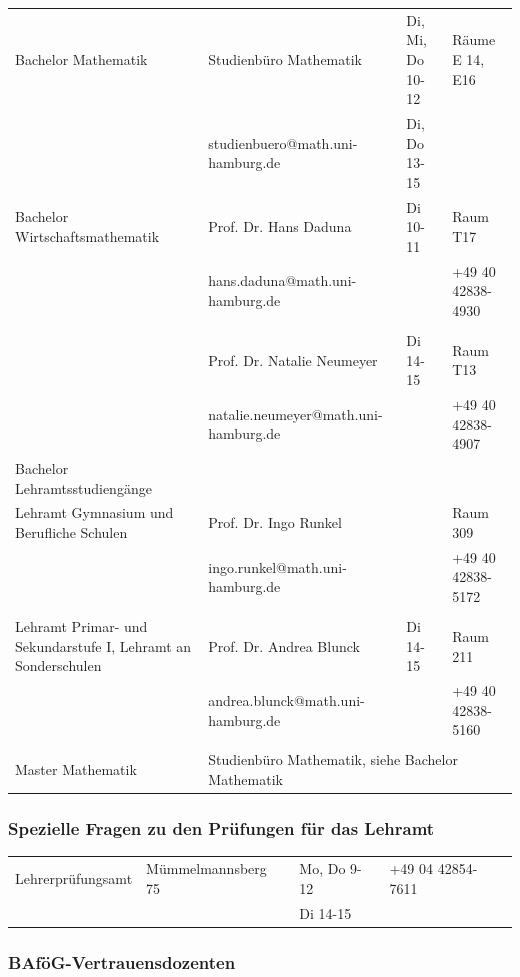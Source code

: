 
\begin{tabularx}{\textwidth}{|X|X|X|X|}
\hline Bachelor Mathematik&Studienbüro Mathematik&Di, Mi, Do \hfill 10-12
    &Räume E 14, E16\\
    &studienbuero@math.uni-hamburg.de&Di, Do \hfill13-15&\\
\hline Bachelor Wirtschaftsmathematik&Prof. Dr. Hans Daduna&Di \hfill 10-11
    &Raum T17 \\
&hans.daduna@math.uni-hamburg.de&&+49 40 42838-4930\\
&&&\\
&Prof. Dr. Natalie Neumeyer&Di \hfill 14-15&Raum T13\\
&natalie.neumeyer@math.uni-hamburg.de&&+49 40 42838-4907\\
\hline Bachelor Lehramtsstudiengänge&&&\\
Lehramt Gymnasium und Berufliche Schulen&Prof. Dr. Ingo Runkel&&Raum 309\\
    &ingo.runkel@math.uni-hamburg.de&&+49 40 42838-5172\\
&&&\\
Lehramt Primar- und Sekundarstufe I, Lehramt an Sonderschulen
    &Prof. Dr. Andrea Blunck&Di \hfill 14-15&Raum 211\\
    &andrea.blunck@math.uni-hamburg.de&&+49 40 42838-5160\\
&&&\\
\hline Master Mathematik
    &\multicolumn{3}{|l|}{Studienbüro Mathematik, siehe Bachelor Mathematik}\\
\hline
\end{tabularx}

\subsubsection{Spezielle Fragen zu den Prüfungen für das Lehramt}

\begin{tabularx}{\textwidth}{|X|X|X|X|}
\hline Lehrerprüfungsamt&Mümmelmannsberg 75&Mo, Do \hfill 9-12
    &+49 04 42854-7611\\
    &&Di \hfill 14-15&\\
\hline
\end{tabularx}

\subsubsection{BAföG-Vertrauensdozenten}

